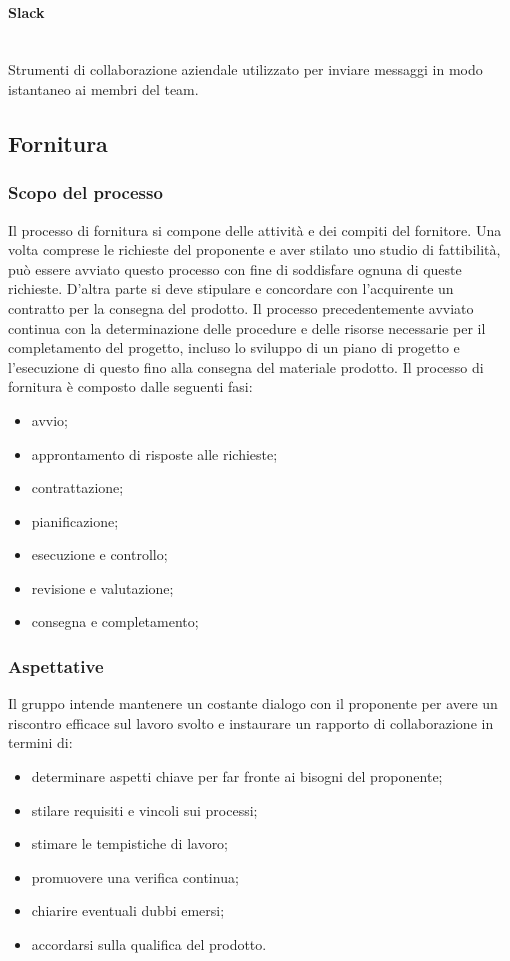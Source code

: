 \begin{itemize}
\paragraph{Slack} \mbox{}\\
Strumenti di collaborazione aziendale utilizzato per inviare messaggi in modo istantaneo ai membri del team.
\subsection{Fornitura}
\subsubsection{Scopo del processo}
Il processo di fornitura si compone delle attività e dei compiti del fornitore. Una volta comprese le richieste del proponente e aver stilato uno studio di fattibilità, può essere avviato questo processo con fine di soddisfare ognuna di queste richieste. D'altra parte si deve stipulare e concordare con l'acquirente un contratto per la consegna del prodotto.
Il processo precedentemente avviato continua con la determinazione delle procedure e delle risorse necessarie per il completamento del progetto, incluso lo sviluppo di un piano di progetto e l'esecuzione di questo fino alla consegna del materiale prodotto.
Il processo di fornitura è composto dalle seguenti fasi:
\begin{itemize}
	\item avvio;
	\item approntamento di risposte alle richieste;
	\item contrattazione;
	\item pianificazione;
	\item esecuzione e controllo;
	\item revisione e valutazione;
	\item consegna e completamento;
\end{itemize}
\subsubsection{Aspettative}
Il gruppo intende mantenere un costante dialogo con il proponente per avere un riscontro efficace sul lavoro svolto e instaurare un rapporto di collaborazione in termini di:
\begin{itemize}
	\item determinare aspetti chiave per far fronte ai bisogni del proponente;
	\item stilare requisiti e vincoli sui processi;
	\item stimare le tempistiche di lavoro;
	\item promuovere una verifica continua;
	\item chiarire eventuali dubbi emersi;
	\item accordarsi sulla qualifica del prodotto.
\end{itemize}

\end{itemize}
